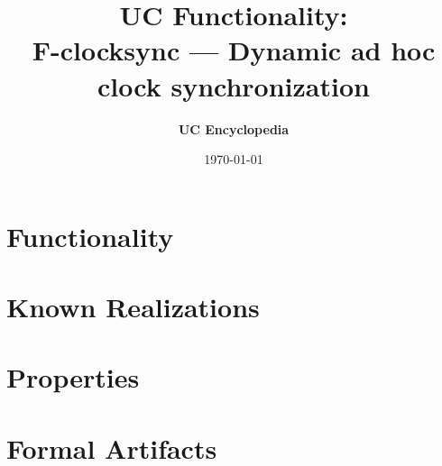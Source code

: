 \documentclass[11pt,a4paper]{article}
\title{\textbf{\Large UC Functionality:}\\[0.2em] \Large F-clocksync --- Dynamic ad hoc clock synchronization}
\author{\textbf{UC Encyclopedia}}
\date{\today}
\newtheorem{functionality}{Functionality}
\begin{document}
\maketitle

\begin{abstract}
\end{abstract}

\section{Functionality}

%

\section{Known Realizations}


\section{Properties}


\section{Formal Artifacts}

\end{document}
